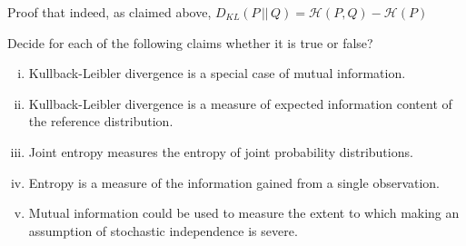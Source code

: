 \documentclass[nobib,nofonts]{tufte-handout}
\begin{document}
{\begin{minipage}{1.0\textwidth}
    \begin{exercise}
      Proof that indeed, as claimed above, $D_{KL}(P \,||\, Q) = \mathcal{H}(P,Q) - \mathcal{H}(P)$
    \end{exercise}

    \begin{exercise}
      Decide for each of the following claims whether it is true or false?
      \begin{enumerate}[(i)]
        \item Kullback-Leibler divergence is a special case of mutual information.
        \item Kullback-Leibler divergence is a measure of expected information content of the reference distribution.
        \item Joint entropy measures the entropy of joint probability distributions.
        \item Entropy is a measure of the information gained from a single observation.
        \item Mutual information could be used to measure the extent to which making an assumption of stochastic independence is severe.
      \end{enumerate}
    \end{exercise}

  \end{minipage}
}
\end{document}
